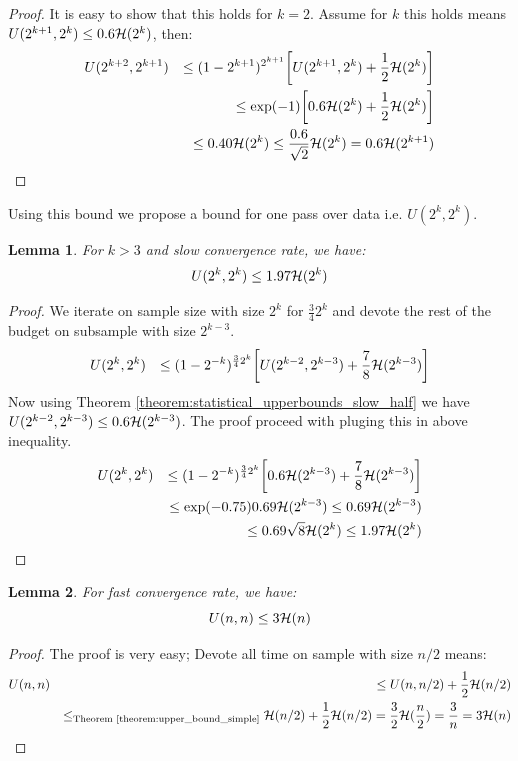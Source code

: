 \documentclass{article}
\newtheorem{lemma}{Lemma}
\newcommand{\bound}{{\cal H}}
\begin{document}
\begin{proof}
	It is easy to show that this holds for $k=2$. Assume for $k$ this holds means 
	$U(2^{k+1},2^k) \leq
	0.6 \bound(2^k)$, then: 
     \begin{eqnarray*}
     	& U(2^{k+2},2^{k+1}) & \leq (1-2^{k+1})^{2^{k+1}} \bigg[
     		U(2^{k+1},2^k) + \frac{1}{2} \bound(2^{k})
     	 \bigg] \\
     	& &  \leq \exp(-1) \bigg[0.6 \bound(2^{k}) +\frac{1}{2}
     	\bound(2^{k})\bigg] \\ 
     	& & \leq 0.40 \bound(2^k) \leq \frac{0.6}{\sqrt{2}} \bound(2^k) =
     	0.6 \bound(2^{k+1})
     \end{eqnarray*}
\end{proof}
Using this bound we propose a bound for one pass over data i.e. $U(2^k,2^k)$.
\begin{lemma}
For $k>3$ and slow convergence rate, we have:
	\begin{equation*}
		U(2^k,2^k) \leq 1.97 \bound(2^k)
	\end{equation*}
\end{lemma}
\begin{proof}
	We iterate on sample size with size $2^k$ for $\frac{3}{4} 2^k$ and devote the
	rest of the budget on subsample with size $2^{k-3}$. 
	\begin{eqnarray*}
		& U(2^k,2^k) & \leq (1-2^{-k})^{\frac{3}{4} 2^{k}}\bigg[ U(2^{k-2},2^{k-3})+
		\frac{7}{8} \bound(2^{k-3}) \bigg]
	\end{eqnarray*}
	Now using Theorem \ref{theorem:statistical_upperbounds_slow_half} we have
	$U(2^{k-2},2^{k-3}) \leq 0.6 \bound(2^{k-3})$. The proof proceed with
	pluging this in above inequality.
	\begin{eqnarray*}
		& U(2^k,2^k) & \leq (1-2^{-k})^{\frac{3}{4} 2^{k}}\bigg[ 0.6
		\bound(2^{k-3})+ \frac{7}{8} \bound(2^{k-3}) \bigg] \\ 
		& & \leq \exp(-0.75) 0.69 \bound(2^{k-3}) \leq 0.69 \bound(2^{k-3}) \\
		& & \leq 0.69 \sqrt{8} \bound(2^{k}) \leq 1.97 \bound(2^k)
	\end{eqnarray*}
\end{proof}
\begin{lemma}
	For fast convergence rate, we have:
	\begin{equation*}
		U(n,n) \leq 3 \bound(n)
	\end{equation*}
\end{lemma}
\begin{proof}
The proof is very easy; Devote all time on sample with size $n/2$ means: 
\begin{eqnarray*}
	& U(n,n) & \leq U(n,n/2) + \frac{1}{2} \bound(n/2) \\
	& & \leq_{\text{Theorem \ref{theorem:upper_bound_simple}}}
	\bound(n/2) + \frac{1}{2} \bound(n/2) = \frac{3}{2} \bound(\frac{n}{2}) =
	\frac{3}{n} = 3 \bound(n)
\end{eqnarray*}
\end{proof}
\end{document}
